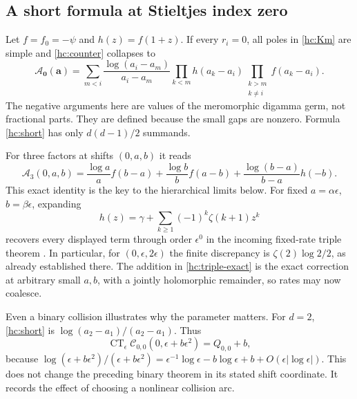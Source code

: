 \documentclass[11pt,a4paper]{article}
\numberwithin{equation}{section}
\theoremstyle{definition}
\theoremstyle{remark}
\DeclareMathOperator{\CT}{CT}
\begin{document}
\subsection{A short formula at Stieltjes index zero}

Let $f=f_0=-\psi$ and $h(z)=f(1+z)$. If every $r_i=0$, all poles in
\eqref{hc:Km} are simple and \eqref{hc:counter} collapses to
\begin{equation}\label{hc:short}
 \boxed{\quad
 \mathcal A_{\boldsymbol0}(\boldsymbol a)=
 \sum_{m<i}\frac{\log(a_i-a_m)}{a_i-a_m}
   \prod_{k<m}h(a_k-a_i)
   \prod_{\substack{k>m\\k\ne i}}f(a_k-a_i).
 \quad}
\end{equation}
The negative arguments here are values of the meromorphic digamma
germ, not fractional parts. They are defined because the small gaps
are nonzero. Formula \eqref{hc:short} has only $d(d-1)/2$ summands.

For three factors at shifts $(0,a,b)$ it reads
\begin{equation}\label{hc:triple-exact}
 \mathcal A_3(0,a,b)=
 \frac{\log a}{a}f(b-a)
 +\frac{\log b}{b}f(a-b)
 +\frac{\log(b-a)}{b-a}h(-b).
\end{equation}
This exact identity is the key to the hierarchical limits below. For
fixed $a=\alpha\epsilon$, $b=\beta\epsilon$, expanding
\begin{equation}\label{hc:hseries}
 h(z)=\gamma+\sum_{k\ge1}(-1)^k\zeta(k+1)z^k
\end{equation}
recovers every displayed term through order $\epsilon^0$ in the
incoming fixed-rate triple theorem \cite{RepoMixed}. In particular,
for $(0,\epsilon,2\epsilon)$ the finite discrepancy is
$\zeta(2)\log2/2$, as already established there. The addition in
\eqref{hc:triple-exact} is the exact correction at arbitrary small
$a,b$, with a jointly holomorphic remainder, so rates may now coalesce.

Even a binary collision illustrates why the parameter matters. For
$d=2$, \eqref{hc:short} is $\log(a_2-a_1)/(a_2-a_1)$. Thus
\begin{equation}\label{hc:binary-curved}
 \CT_{\epsilon}\mathcal C_{0,0}(0,\epsilon+b\epsilon^2)
     =Q_{0,0}+b,
\end{equation}
because
$\log(\epsilon+b\epsilon^2)/(\epsilon+b\epsilon^2)
 =\epsilon^{-1}\log\epsilon-b\log\epsilon+b+O(\epsilon|\log\epsilon|)$.
This does not change the preceding binary theorem in its stated shift
coordinate. It records the effect of choosing a nonlinear collision arc.
\end{document}
